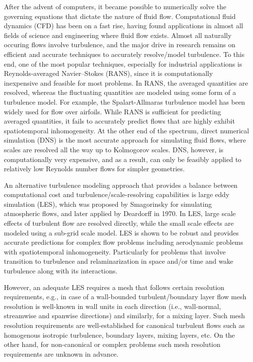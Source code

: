 After the advent of computers, it became possible to numerically solve the governing equations that dictate the nature of fluid flow.
Computational fluid dynamics (CFD) has been on a fast rise, having found applications in almost all fields of science and engineering where fluid flow exists.
Almost all naturally occuring flows involve turbulence, and the major drive in research remains on efficient and accurate techniques to accurately resolve/model turbulence.
To this end, one of the most popular techniques, especially for industrial applications is Reynolds-averaged Navier–Stokes (RANS), since it is computationally inexpensive and feasible for most problems.
In RANS, the averaged quantities are resolved, whereas the fluctuating quantities are modeled using some form of a turbulence model. For example, the Spalart-Allmaras turbulence model \cite{bib:Spalart} has been widely used for flow over airfoils.
While RANS is sufficient for predicting averaged quantities, it fails to accurately predict flows that are highly exhibit spatiotemporal inhomogeneity.
At the other end of the spectrum, direct numerical simulation (DNS) is the most accurate approach for simulating fluid flows, where scales are resolved all the way up to Kolmogorov scales.
DNS, however, is computationally very expensive, and as a result, can only be feasibly applied to relatively low Reynolds number flows for simpler geometries.

An alternative turbulence modeling approach that provides a balance between computational cost and turbulence/scale-resolving capabilities is large eddy simulation (LES), which was proposed by Smagorinsky \cite{bib:smag} for simulating atmospheric flows, and later applied by Deardorff \cite{bib:deardorff1970} in 1970.
In LES, large scale effects of turbulent flow are resolved directly, while the small scale effects are modeled using a sub-grid scale model.
LES is shown to be robust and provides accurate predictions for complex flow problems including aerodynamic problems with spatiotemporal inhomogeneity. Particularly for problems that involve transition to turbulence and relaminarization in space and/or time and wake turbulence along with its interactions.

However, an adequate LES requires a mesh that follows certain resolution requirements, e.g., in case of a wall-bounded turbulent/boundary layer flow mesh resolution is well-known in wall units in each direction (i.e., wall-normal, streamwise and spanwise directions) and similarly, for a mixing layer.
Such mesh resolution requirements are well-established for canonical turbulent flows such as homogenous isotropic turbulence, boundary layers, mixing layers, etc. 
On the other hand, for non-canonical or complex problems such mesh resolution requirements are unknown in advance. 

